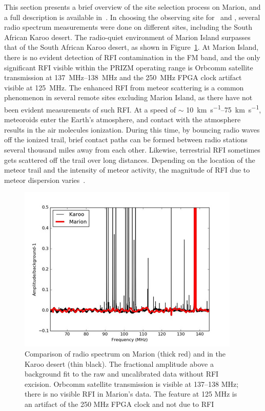 This section presents a brief overview of the site selection process on Marion, and a full description is available in~\citet{2019JAI.....850004P}. In choosing the observing site for \prizm\ and \albatros, several radio spectrum measurements were done on different sites, including the South African Karoo desert. The radio-quiet environment of Marion Island surpasses that of the South African Karoo desert, as shown in Figure~\ref{fig:karoo}. At Marion Island, there is no evident detection of RFI contamination in the FM band, and the only significant RFI visible within the PRIZM operating range is Orbcomm satellite transmission at \SIrange{137}{138}{\mega\hertz} and the \SI{250}{\mega\hertz} FPGA clock artifact visible at \SI{125}{\mega\hertz}. The enhanced RFI from meteor scattering is a common phenomenon in several remote sites excluding Marion Island, as there have not been evident measurements of such RFI. At a speed of $\sim$ \SIrange{10}{75}{\kilo \meter \per \second}, meteoroids enter the Earth's atmosphere, and contact with the atmosphere results in the air molecules ionization. During this time, by bouncing radio waves off the ionized trail, brief contact paths can be formed between radio stations several thousand miles away from each other. Likewise, terrestrial RFI sometimes gets scattered off the trail over long distances. Depending on the location of the meteor trail and the intensity of meteor activity, the magnitude of RFI due to meteor dispersion varies~\citep{1996pimo.conf...99W}.

\begin{figure}
	\centering
	\includegraphics[width=\linewidth]{Figures/karoo}
	\caption{Comparison of radio spectrum on Marion (thick red) and in the Karoo desert (thin black). The fractional amplitude above a background fit to the raw and uncalibrated data without RFI excision. Orbcomm satellite transmission is visible at 137–138 MHz; there is no visible RFI in Marion's data. The feature at 125 MHz is an artifact of the 250 MHz FPGA clock and not due to RFI~\citep{2019JAI.....850004P}}
	\label{fig:karoo}
\end{figure}

